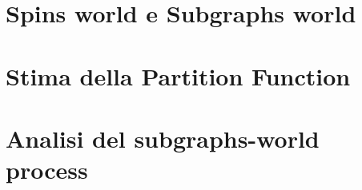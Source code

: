 \section{Spins world e Subgraphs world}
\section{Stima della Partition Function}
\section{Analisi del subgraphs-world process}
